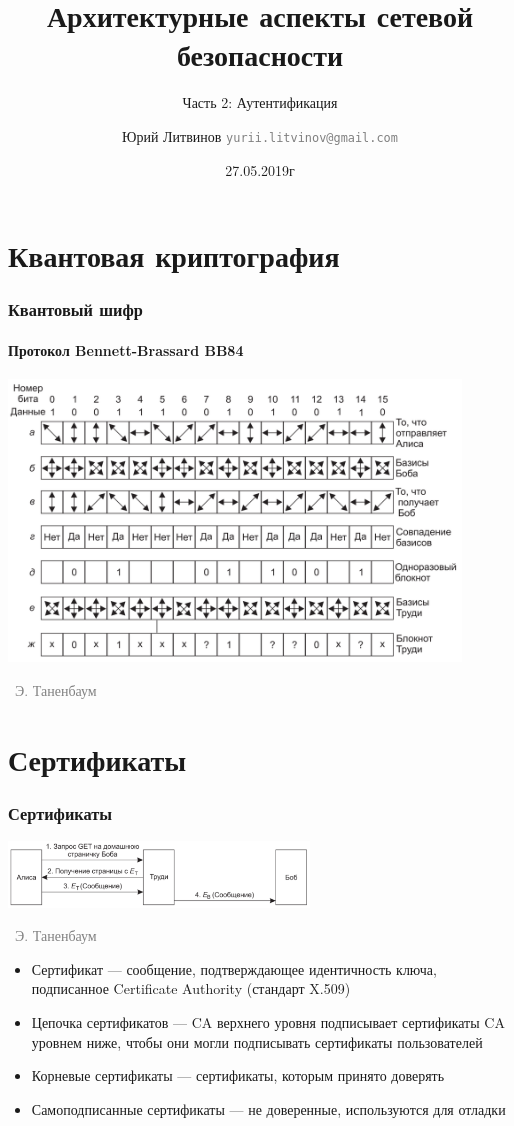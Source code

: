 \documentclass[xetex,mathserif,serif]{beamer}
\title{Архитектурные аспекты сетевой безопасности}
\subtitle{Часть 2: Аутентификация}
\author[Юрий Литвинов]{Юрий Литвинов \newline \textcolor{gray}{\small\texttt{yurii.litvinov@gmail.com}}}
\date{27.05.2019г}
\newcommand{\attribution}[1] {
\vspace{-5mm}\begin{flushright}\begin{scriptsize}\textcolor{gray}{\textcopyright\, #1}\end{scriptsize}\end{flushright}
}
\begin{document}
	\frame{\titlepage}

	\section{Квантовая криптография}

	\begin{frame}
		\frametitle{Квантовый шифр}
		\framesubtitle{Протокол Bennett-Brassard BB84}
		\begin{center}
			\includegraphics[width=0.9\textwidth]{quantumCipher.png}
			\attribution{Э. Таненбаум}
		\end{center}
	\end{frame}

	\section{Сертификаты}

	\begin{frame}
		\frametitle{Сертификаты}
		\begin{center}
			\includegraphics[width=0.6\textwidth]{manInTheMiddle.png}
			\attribution{Э. Таненбаум}
		\end{center}
		\begin{itemize}
			\item Сертификат --- сообщение, подтверждающее идентичность ключа, подписанное Certificate Authority (стандарт X.509)
			\item Цепочка сертификатов --- CA верхнего уровня подписывает сертификаты CA уровнем ниже, чтобы они могли подписывать сертификаты пользователей
			\item Корневые сертификаты --- сертификаты, которым принято доверять
			\item Самоподписанные сертификаты --- не доверенные, используются для отладки
		\end{itemize}
	\end{frame}
\end{document}
